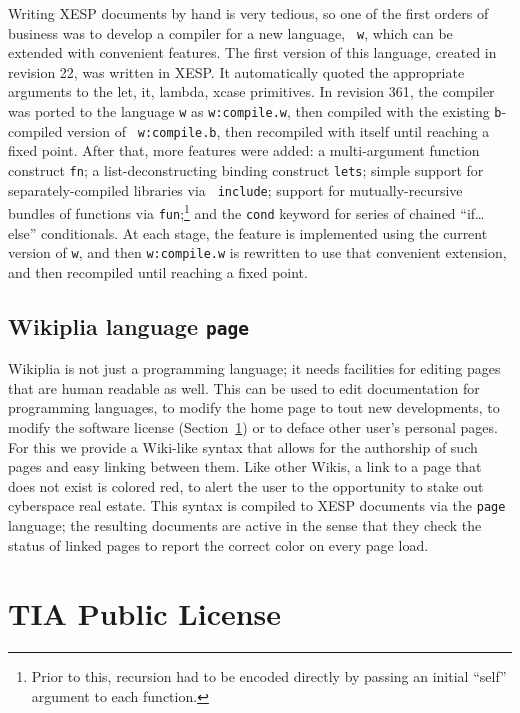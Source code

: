 \documentclass[twocolumn]{article}
\begin{document}
Writing XESP documents by hand is very tedious, so one of the first
orders of business was to develop a compiler for a new language, {\tt
w}, which can be extended with convenient features. The first version
of this language, created in revision 22, was written in XESP. It
automatically quoted the appropriate arguments to the {\sf let}, {\sf
it}, {\sf lambda}, {\sf xcase} primitives. In revision 361, the
compiler was ported to the language {\tt w} as {\tt w:compile.w}, then
compiled with the existing {\tt b}-compiled version of {\tt
w:compile.b}, then recompiled with itself until reaching a fixed
point.\z{} After that, more features
were added: a multi-argument function construct {\tt fn}; a
list-deconstructing binding construct {\tt lets}; simple support for
separately-compiled libraries via {\tt
include}; support for mutually-recursive bundles of functions via {\tt fun};\footnote{Prior to
this, recursion had to be encoded directly by passing an initial
``self'' argument to each function.} and the {\tt cond} keyword for
series of chained ``if\ldots else'' conditionals. At each stage, the
feature is implemented using the current version of {\tt w}, and then
{\tt w:compile.w} is rewritten to use that convenient extension, and
then recompiled until reaching a fixed point.

\subsection{Wikiplia language {\tt page}}

Wikiplia is not just a programming language; it needs facilities for
editing pages that are human readable as well. This can be used to
edit documentation for programming languages, to modify the home page
to tout new developments, to modify the software license
(Section~\ref{sec:license}) or to deface other user's personal pages.
For this we provide a Wiki-like syntax that allows for the
authorship of such pages and easy linking between them. Like other
Wikis, a link to a page that does not exist is colored red, to alert
the user to the opportunity to stake out cyberspace real estate. This
syntax is compiled to XESP documents via the {\tt page} language; the
resulting documents are active in the sense that they check the status
of linked pages to report the correct color on every page load.

\section{TIA Public License} \label{sec:license}
\end{document}
